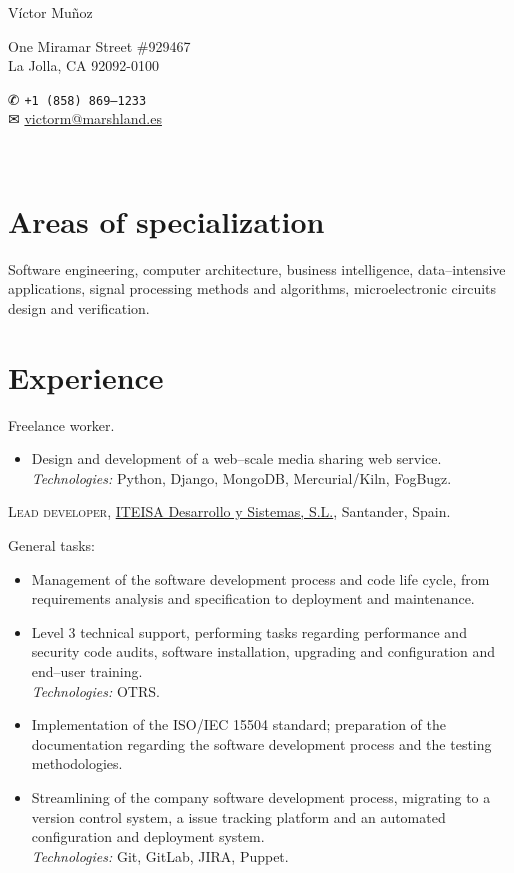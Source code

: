\documentclass[11pt]{article}
\newcommand{\years}[1]{\marginnote{\scriptsize #1}}
\begin{document}
\begin{minipage}[m]{.3\textwidth}
	{\LARGE Víctor Muñoz}
\end{minipage}
\begin{minipage}[m]{.35\textwidth}
	One Miramar Street \#929467\\
	La Jolla, CA 92092-0100
\end{minipage}
\begin{minipage}[m]{.3\textwidth}
	{\dingbats ✆} \texttt{+1 (858) 869--1233}\\
	{\dingbats ✉} \href{mailto:victorm@marshland.es}
	                    {victorm@marshland.es}
\end{minipage}\\[.05cm]


\section*{Areas of specialization} %
Software engineering, computer architecture, business intelligence, data--intensive applications, signal processing methods and algorithms, microelectronic circuits design and verification.


\section*{Experience}  %
\noindent
\years{2012--present}Freelance worker.
\begin{itemize}
	\item  Design and development of a web--scale media sharing web service.\\
	\textit{Technologies:} Python, Django, MongoDB, Mercurial/Kiln, FogBugz.
\end{itemize}

\years{2011--2013}\textsc{Lead developer}, \href{http://www.iteisa.com}{ITEISA Desarrollo y Sistemas, S.L.}, Santander, Spain.

General tasks:
\begin{itemize}
	\item  Management of the software development process and code life cycle, from requirements analysis and specification to deployment and maintenance.
	\item  Level 3 technical support, performing tasks regarding performance and security code audits, software installation, upgrading and configuration and end--user training.\\
	\textit{Technologies:} OTRS.
	\item  Implementation of the ISO/IEC 15504 standard; preparation of the documentation regarding the software development process and the testing methodologies.
	\item  Streamlining of the company software development process, migrating to a version control system, a issue tracking platform and an automated configuration and deployment system.\\
	\textit{Technologies:} Git, GitLab, JIRA, Puppet.
\end{itemize}
\end{document}
